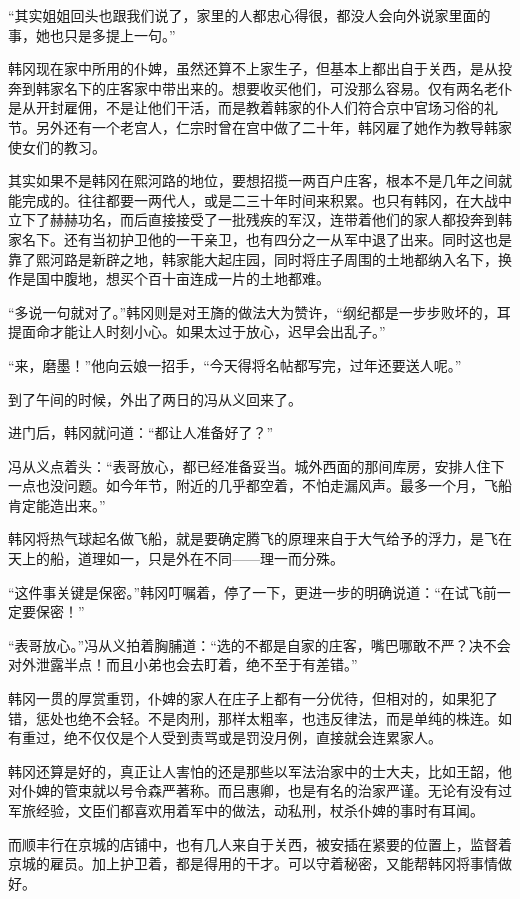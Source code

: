 “其实姐姐回头也跟我们说了，家里的人都忠心得很，都没人会向外说家里面的事，她也只是多提上一句。”

韩冈现在家中所用的仆婢，虽然还算不上家生子，但基本上都出自于关西，是从投奔到韩家名下的庄客家中带出来的。想要收买他们，可没那么容易。仅有两名老仆是从开封雇佣，不是让他们干活，而是教着韩家的仆人们符合京中官场习俗的礼节。另外还有一个老宫人，仁宗时曾在宫中做了二十年，韩冈雇了她作为教导韩家使女们的教习。

其实如果不是韩冈在熙河路的地位，要想招揽一两百户庄客，根本不是几年之间就能完成的。往往都要一两代人，或是二三十年时间来积累。也只有韩冈，在大战中立下了赫赫功名，而后直接接受了一批残疾的军汉，连带着他们的家人都投奔到韩家名下。还有当初护卫他的一干亲卫，也有四分之一从军中退了出来。同时这也是靠了熙河路是新辟之地，韩家能大起庄园，同时将庄子周围的土地都纳入名下，换作是国中腹地，想买个百十亩连成一片的土地都难。

“多说一句就对了。”韩冈则是对王旖的做法大为赞许，“纲纪都是一步步败坏的，耳提面命才能让人时刻小心。如果太过于放心，迟早会出乱子。”

“来，磨墨！”他向云娘一招手，“今天得将名帖都写完，过年还要送人呢。”

到了午间的时候，外出了两日的冯从义回来了。

进门后，韩冈就问道：“都让人准备好了？”

冯从义点着头：“表哥放心，都已经准备妥当。城外西面的那间库房，安排人住下一点也没问题。如今年节，附近的几乎都空着，不怕走漏风声。最多一个月，飞船肯定能造出来。”

韩冈将热气球起名做飞船，就是要确定腾飞的原理来自于大气给予的浮力，是飞在天上的船，道理如一，只是外在不同——理一而分殊。

“这件事关键是保密。”韩冈叮嘱着，停了一下，更进一步的明确说道：“在试飞前一定要保密！”

“表哥放心。”冯从义拍着胸脯道：“选的不都是自家的庄客，嘴巴哪敢不严？决不会对外泄露半点！而且小弟也会去盯着，绝不至于有差错。”

韩冈一贯的厚赏重罚，仆婢的家人在庄子上都有一分优待，但相对的，如果犯了错，惩处也绝不会轻。不是肉刑，那样太粗率，也违反律法，而是单纯的株连。如有重过，绝不仅仅是个人受到责骂或是罚没月例，直接就会连累家人。

韩冈还算是好的，真正让人害怕的还是那些以军法治家中的士大夫，比如王韶，他对仆婢的管束就以号令森严著称。而吕惠卿，也是有名的治家严谨。无论有没有过军旅经验，文臣们都喜欢用着军中的做法，动私刑，杖杀仆婢的事时有耳闻。

而顺丰行在京城的店铺中，也有几人来自于关西，被安插在紧要的位置上，监督着京城的雇员。加上护卫着，都是得用的干才。可以守着秘密，又能帮韩冈将事情做好。

